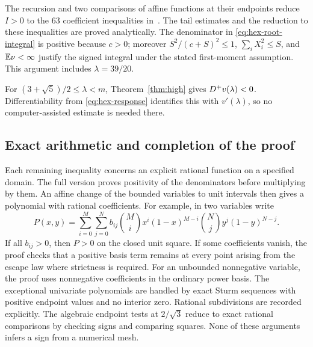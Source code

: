 The recursion and two comparisons of affine functions at their endpoints reduce $I>0$ to the $63$ coefficient inequalities in~\cite[Lemma~6.36]{FullVersion}. The tail estimates and the reduction to these inequalities are proved analytically. The denominator in
\eqref{eq:hex-root-integral} is positive because $c>0$; moreover
$S^2/(c+S)^2\le1$, $\sum_iX_i^2\le S$, and $\mathbb E\nu<\infty$ justify
the signed integral under the stated first-moment assumption.
This argument includes $\lambda=39/20$.

For $(3+\sqrt5)/2\le\lambda<m$, Theorem~\ref{thm:high} gives $D^{+} v(\lambda)<0$.
Differentiability from \eqref{eq:hex-response} identifies this with
$v'(\lambda)$, so no computer-assisted estimate is needed there.

\newpage
\subsection{Exact arithmetic and completion of the proof}
Each remaining inequality concerns an explicit rational function on a specified domain. The full version proves positivity of the denominators before multiplying by them. An affine change of the bounded variables to unit intervals then gives a polynomial with rational coefficients. For example, in two variables write
\[
 P(x,y)=\sum_{i=0}^{M}\sum_{j=0}^{N}b_{ij}
       \binom Mi x^i(1-x)^{M-i}\binom Nj y^j(1-y)^{N-j}.
\]
If all $b_{ij}>0$, then $P>0$ on the closed unit square. If some
coefficients vanish, the proof checks that a positive basis term
remains at every point arising from the escape law where strictness is required. For an unbounded nonnegative variable, the proof uses nonnegative coefficients in the ordinary power basis. The exceptional univariate polynomials
are handled by exact Sturm sequences with positive endpoint values
and no interior zero. Rational subdivisions are recorded explicitly.
The algebraic endpoint tests at $2/\sqrt3$ reduce to exact rational
comparisons by checking signs and comparing squares. None of these
arguments infers a sign from a numerical mesh.

